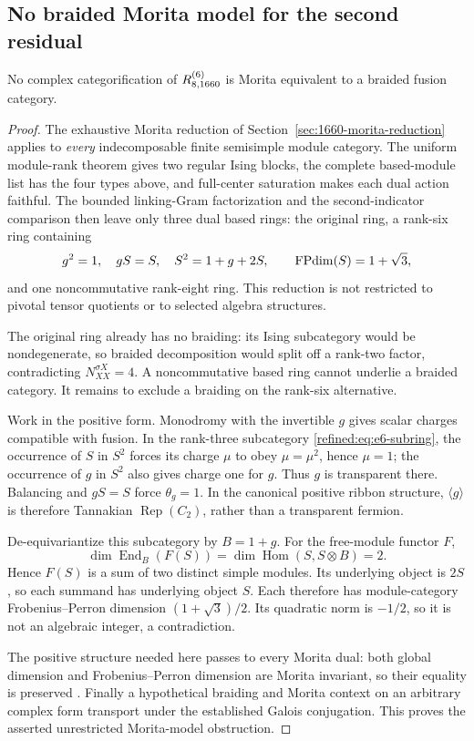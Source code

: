 \subsection{No braided Morita model for the second residual}
\begin{proposition}
No complex categorification of $R^{(6)}_{8,1660}$ is Morita equivalent to a braided fusion category.
\end{proposition}
\begin{proof}
The exhaustive Morita reduction of Section~\ref{sec:1660-morita-reduction} applies to \emph{every} indecomposable finite semisimple module category. The uniform module-rank theorem gives two regular Ising blocks, the complete based-module list has the four types above, and full-center saturation makes each dual action faithful. The bounded linking-Gram factorization and the second-indicator comparison then leave only three dual based rings: the original ring, a rank-six ring containing
\begin{equation}\label{refined:eq:e6-subring}
 g^2=1,\quad gS=S,\quad S^2=1+g+2S,
 \qquad\operatorname{FPdim}(S)=1+\sqrt3,
\end{equation}
and one noncommutative rank-eight ring. This reduction is not restricted to pivotal tensor quotients or to selected algebra structures.

The original ring already has no braiding: its Ising subcategory would be nondegenerate, so braided decomposition would split off a rank-two factor, contradicting $N_{XX}^{\sigma X}=4$. A noncommutative based ring cannot underlie a braided category. It remains to exclude a braiding on the rank-six alternative.

Work in the positive form. Monodromy with the invertible $g$ gives scalar charges compatible with fusion. In the rank-three subcategory \eqref{refined:eq:e6-subring}, the occurrence of $S$ in $S^2$ forces its charge $\mu$ to obey $\mu=\mu^2$, hence $\mu=1$; the occurrence of $g$ in $S^2$ also gives charge one for $g$. Thus $g$ is transparent there. Balancing and $gS=S$ force $\theta_g=1$. In the canonical positive ribbon structure, $\langle g\rangle$ is therefore Tannakian $\operatorname{Rep}(C_2)$, rather than a transparent fermion.

De-equivariantize this subcategory by $B=1+g$. For the free-module functor $F$,
\[
 \dim\operatorname{End}_{B}(F(S))
 =\dim\operatorname{Hom}(S,S\otimes B)=2.
\]
Hence $F(S)$ is a sum of two distinct simple modules. Its underlying object is $2S$, so each summand has underlying object $S$. Each therefore has module-category Frobenius--Perron dimension $(1+\sqrt3)/2$. Its quadratic norm is $-1/2$, so it is not an algebraic integer, a contradiction.

The positive structure needed here passes to every Morita dual: both global dimension and Frobenius--Perron dimension are Morita invariant, so their equality is preserved \cite[Theorem 2.15 and Corollary 8.14]{ENO}. Finally a hypothetical braiding and Morita context on an arbitrary complex form transport under the established Galois conjugation. This proves the asserted unrestricted Morita-model obstruction.
\end{proof}
